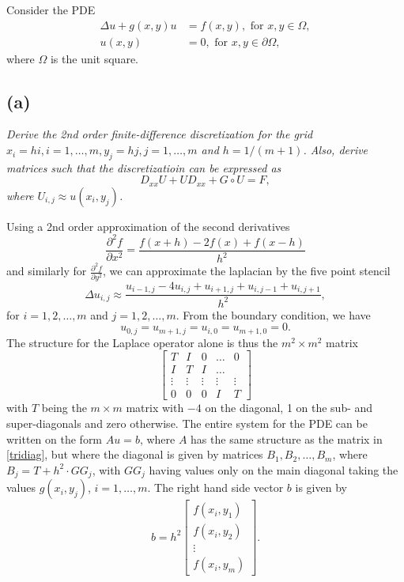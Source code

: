 Consider the PDE 
\begin{equation}
\begin{aligned}
\Delta u+g(x,y)u &= f(x,y),\text{ for }x,y\in\Omega,\\
u(x,y) & = 0,\text{ for }x,y\in\partial\Omega,
\end{aligned}
\end{equation}
where $\Omega$ is the unit square. 
\subsection*{(a)}
\emph{Derive the 2nd order finite-difference discretization for the grid $x_i = hi, i = 1,\dots,m,y_j = hj,j = 1,\dots,m$ and $h = 1/(m+1)$. Also, derive matrices such that the discretizatioin can be expressed as 
\begin{equation}\label{lyapPDE}
D_{xx}U+UD_{xx}+G\circ U = F, 
\end{equation}
where $U_{i,j} \approx u(x_i,y_j)$. }

Using a 2nd order approximation of the second derivatives 
\begin{equation}
\frac{\partial^2 f}{\partial x^2} = \frac{f(x+h)-2f(x)+f(x-h)}{h^2}
\end{equation}
and similarly for $\frac{\partial^2 f}{\partial y^2}$, we can approximate the laplacian by the five point stencil 
\begin{equation}
\Delta u_{i,j} \approx \frac{u_{i-1,j}-4u_{i,j}+u_{i+1,j}+u_{i,j-1}+u_{i,j+1}}{h^2},
\end{equation}
for $i = 1,2,\dots,m$ and $j = 1,2,\dots,m$.
From the boundary condition, we have
\begin{equation}
u_{0,j} = u_{m+1,j}=u_{i,0} = u_{m+1,0} = 0.
\end{equation}  
The structure for the Laplace operator alone is thus the $m^2\times m^2$ matrix
\begin{equation}\label{tridiag}
\begin{bmatrix}
T &I &0 &\dots& 0\\
I & T& I & \dots \\
\vdots &\vdots& \vdots &\vdots& \vdots\\
0 & 0 & 0 &I& T
\end{bmatrix}
\end{equation}
with $T$ being the $m\times m$ matrix with $-4$ on the diagonal, 1 on the sub- and super-diagonals and zero otherwise. 
The entire system for the PDE can be written on the form $Au = b$, where $A$ has the same structure as the matrix in \eqref{tridiag}, but where the diagonal is given by matrices $B_1,B_2,\dots, B_m$, where $B_j = T+h^2\cdot GG_j$, with $GG_j$ having values only on the main diagonal taking the values $g(x_i,y_j)$, $i=1,\dots,m$. The right hand side vector $b$ is given by 
\begin{equation}
b = h^2
\begin{bmatrix}
f(x_i,y_1)\\
f(x_i,y_2)\\
\vdots\\
f(x_i,y_m)
\end{bmatrix}.
\end{equation}


